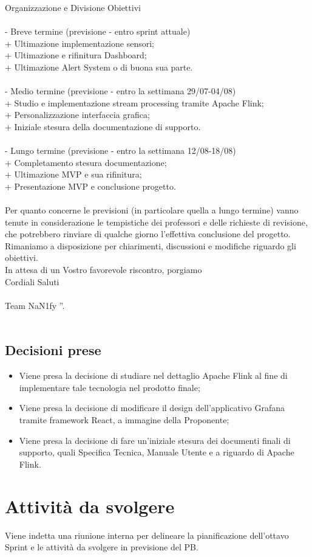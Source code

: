 \documentclass[8pt]{article}
\newcommand{\signatureline}[1]{%
	 \par\vspace{0.5cm}
	\noindent\makebox[\linewidth][r]{\rule{0.2\textwidth}{0.5pt}\hspace{3cm}\makebox[0pt][r]{\vspace{3pt}\footnotesize #1}}%
}
\begin{document}
Organizzazione e Divisione Obiettivi\\\\
- Breve termine (previsione - entro sprint attuale)\\
+ Ultimazione implementazione sensori;\\
+ Ultimazione e rifinitura Dashboard;\\
+ Ultimazione Alert System o di buona sua parte.\\\\

- Medio termine (previsione - entro la settimana 29/07-04/08)\\
+ Studio e implementazione stream processing tramite Apache Flink;\\
+ Personalizzazione interfaccia grafica;\\
+ Iniziale stesura della documentazione di supporto.\\\\

- Lungo termine (previsione - entro la settimana 12/08-18/08)\\
+ Completamento stesura documentazione;\\
+ Ultimazione MVP e sua rifinitura;\\
+ Presentazione MVP e conclusione progetto.\\\\

Per quanto concerne le previsioni (in particolare quella a lungo termine) vanno tenute in considerazione le tempistiche dei professori e delle richieste di revisione, che potrebbero rinviare di qualche giorno l'effettiva conclusione del progetto.
Rimaniamo a disposizione per chiarimenti, discussioni e modifiche riguardo gli obiettivi.\\
In attesa di un Vostro favorevole riscontro, porgiamo\\
Cordiali Saluti\\\\
Team NaN1fy
''.\\\\
\subsection{Decisioni prese}
\begin{itemize}
	\setlength\itemsep{0em}
	\item Viene presa la decisione di studiare nel dettaglio Apache Flink al fine di implementare tale tecnologia nel prodotto finale;
	\item Viene presa la decisione di modificare il design dell'applicativo Grafana tramite framework React, a immagine della Proponente;
	\item Viene presa la decisione di fare un'iniziale stesura dei documenti finali di supporto, quali Specifica Tecnica, Manuale Utente e a riguardo di Apache Flink.
\end{itemize}
\newpage
\section{Attività da svolgere}
Viene indetta una riunione interna per delineare la pianificazione dell'ottavo Sprint e le attività da svolgere in previsione del PB.
\signatureline{Padova, 2024-08-01}
\end{document}

